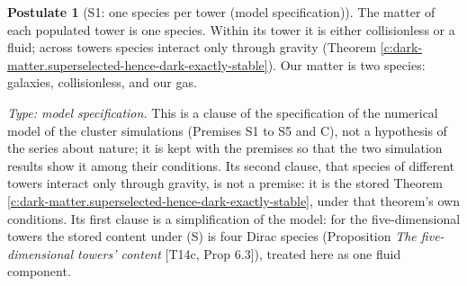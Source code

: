\documentclass[11pt]{article}
\theoremstyle{definition}
\newtheorem{postulate}[theorem]{Postulate}
\theoremstyle{plain}
\newcommand{\changedmark}[2]{\marginpar{\raggedright\scriptsize\color{#1}#2}}
\begin{document}
\begin{postulate}[S1: one species per tower (model specification)]\label{c:simulations.s1-one-species-per-tower}
\changedmark{BurntOrange}{changed since the deposit}
The matter of each populated tower is one species. Within its tower it is either collisionless or a fluid; across towers species interact only through gravity (Theorem \ref{c:dark-matter.superselected-hence-dark-exactly-stable}). Our matter is two species: galaxies, collisionless, and our gas.

\emph{Type: model specification.} This is a clause of the specification of the numerical model of the cluster simulations (Premises S1 to S5 and C), not a hypothesis of the series about nature; it is kept with the premises so that the two simulation results show it among their conditions. Its second clause, that species of different towers interact only through gravity, is not a premise: it is the stored Theorem \ref{c:dark-matter.superselected-hence-dark-exactly-stable}, under that theorem's own conditions. Its first clause is a simplification of the model: for the five-dimensional towers the stored content under (S) is four Dirac species (Proposition \emph{The five-dimensional towers' content} [T14c, Prop 6.3]), treated here as one fluid component.
\end{postulate}
\end{document}
